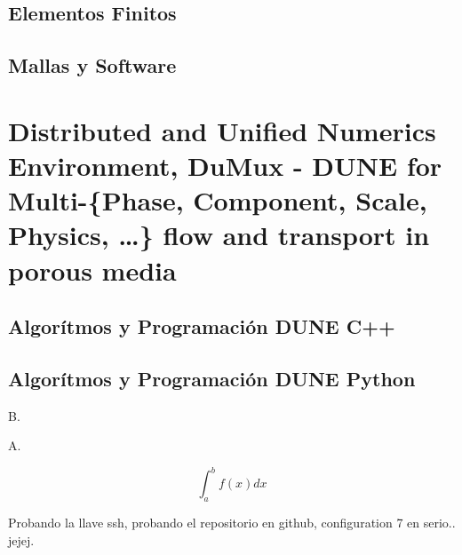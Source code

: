 \documentclass[10pt,
	a4paper,
	spanish,
	titlepage=firstiscover,
	titlepage=true,
	BCOR=2cm,
	DIV=12
]{scrbook}
\begin{document}
\begin{refsection}
	\chapter{Elementos Finitos}
	\chapter{Mallas y Software}
	\part{Distributed and Unified Numerics Environment, DuMux - DUNE for Multi-\{Phase, Component, Scale, Physics, \dots\} flow and transport in porous media} %
	\chapter{Algorítmos y Programación DUNE C++} %
	\chapter{Algorítmos y Programación DUNE Python}

	B.\cite{Reilly}

	\printbibliography[
	title={Referencias},
	heading=bibintoc]
	\nocite{*}
	\printbibliography[
	title={Bibliografía},
	heading=none,keyword=paper]
\end{refsection}

A.

$$\int_a^b f(x)dx$$

Probando la llave ssh, probando el repositorio en github, configuration 7 en serio.. jejej.

\printindex
\end{document}
